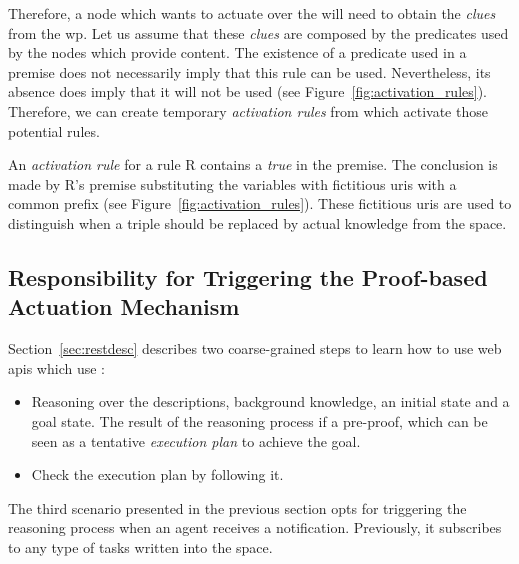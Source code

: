 Therefore, a node which wants to actuate over the \Space{} will need to obtain the \emph{clues} from the \ac{wp}.
Let us assume that these \emph{clues} are composed by the predicates used by the nodes which provide content. %
The existence of a predicate used in a premise does not necessarily imply that this rule can be used.
Nevertheless, its absence does imply that it will not be used (see Figure~\ref{fig:activation_rules}).
Therefore, we can create temporary \emph{activation rules} from \clues{} which activate those potential rules. %




An \emph{activation rule} for a rule R contains a \emph{true} in the premise.
The conclusion is made by R's premise substituting the variables with fictitious \acsp{uri} with a common prefix (see Figure~\ref{fig:activation_rules}).
These fictitious \acsp{uri} are used to distinguish when a triple should be replaced by actual knowledge from the space. %



\subsection{Responsibility for Triggering the Proof-based Actuation Mechanism}
\label{sec:responsible_proof}

Section~\ref{sec:restdesc} describes two coarse-grained steps to learn how to use web \acsp{api} which use \restdesc{}:
\begin{itemize}
  \item Reasoning over the descriptions, background knowledge, an initial state and a goal state.
        The result of the reasoning process if a pre-proof, which can be seen as a tentative \emph{execution plan} to achieve the goal.
  \item Check the execution plan by following it.
\end{itemize}


The third scenario presented in the previous section opts for triggering the reasoning process when an agent receives a notification.
Previously, it subscribes to any type of tasks written into the space.


